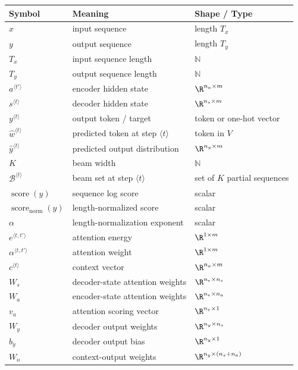 \begin{center}
\begin{tabular}{lll}
\toprule
Symbol & Meaning & Shape / Type \\
\midrule
$x$ & input sequence & length $T_x$ \\
$y$ & output sequence & length $T_y$ \\
$T_x$ & input sequence length & $\mathbb{N}$ \\
$T_y$ & output sequence length & $\mathbb{N}$ \\
$a^{\langle t'\rangle}$ & encoder hidden state & $\R^{n_a \times m}$ \\
$s^{\langle t\rangle}$ & decoder hidden state & $\R^{n_s \times m}$ \\
$y^{\langle t\rangle}$ & output token / target & token or one-hot vector \\
$\hat{w}^{\langle t\rangle}$ & predicted token at step $\langle t\rangle$ & token in $V$ \\
$\hat{y}^{\langle t\rangle}$ & predicted output distribution & $\R^{n_y \times m}$ \\
$K$ & beam width & $\mathbb{N}$ \\
$\mathcal{B}^{\langle t\rangle}$ & beam set at step $\langle t\rangle$ & set of $K$ partial sequences \\
$\operatorname{score}(y)$ & sequence log score & scalar \\
$\operatorname{score}_{\mathrm{norm}}(y)$ & length-normalized score & scalar \\
$\alpha$ & length-normalization exponent & scalar \\
$e^{\langle t,t'\rangle}$ & attention energy & $\R^{1 \times m}$ \\
$\alpha^{\langle t,t'\rangle}$ & attention weight & $\R^{1 \times m}$ \\
$c^{\langle t\rangle}$ & context vector & $\R^{n_a \times m}$ \\
$W_s$ & decoder-state attention weights & $\R^{n_e \times n_s}$ \\
$W_a$ & encoder-state attention weights & $\R^{n_e \times n_a}$ \\
$v_a$ & attention scoring vector & $\R^{n_e \times 1}$ \\
$W_y$ & decoder output weights & $\R^{n_y \times n_s}$ \\
$b_y$ & decoder output bias & $\R^{n_y \times 1}$ \\
$W_o$ & context-output weights & $\R^{n_y \times (n_s+n_a)}$ \\

\end{tabular}
\end{center}
